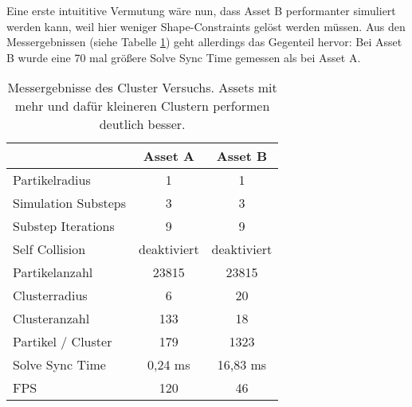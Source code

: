 
Eine erste intuititive Vermutung wäre nun, dass Asset B performanter simuliert werden kann, weil hier weniger Shape-Constraints gelöst werden müssen. Aus den Messergebnissen (siehe Tabelle \ref{table_clusters}) geht allerdings das Gegenteil hervor: Bei Asset B wurde eine 70 mal größere Solve Sync Time gemessen als bei Asset A. 


\begin{table}[hbt!]
\centering
\caption{Messergebnisse des Cluster Versuchs. Assets mit mehr und dafür kleineren Clustern performen deutlich besser.}
\label{table_clusters}
\begin{tabular}{l|cc}
                   & \textbf{Asset A} & \textbf{Asset B} \\ \hline
Partikelradius     & 1                & 1                \\
Simulation Substeps     & 3            & 3            \\
Substep Iterations     & 9            & 9            \\
Self Collision     & deaktiviert            & deaktiviert            \\
Partikelanzahl     & 23815            & 23815            \\
Clusterradius      & 6                & 20               \\
Clusteranzahl      & 133              & 18               \\
Partikel / Cluster & 179              & 1323             \\
Solve Sync Time    & 0,24 ms          & 16,83 ms         \\
FPS                & 120              & 46              

\end{tabular}
\end{table}

